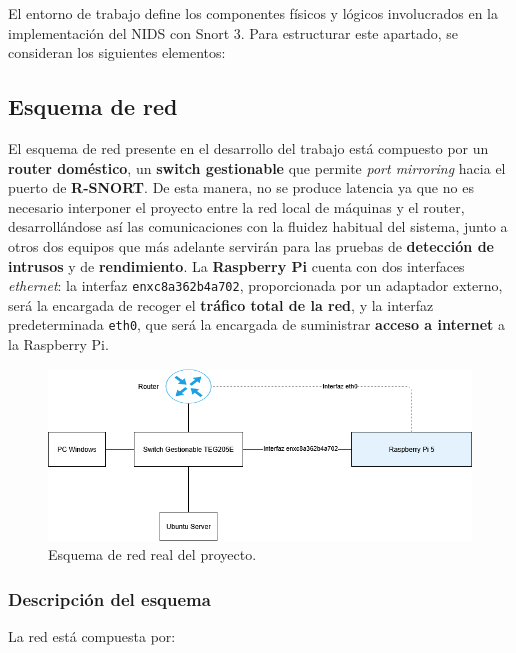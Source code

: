 \documentclass[11pt,a4paper,twoside]{report}
\begin{document}
El entorno de trabajo define los componentes físicos y lógicos involucrados en la implementación del NIDS con Snort 3. Para estructurar este apartado, se consideran los siguientes elementos:

\subsection{Esquema de red}

El esquema de red presente en el desarrollo del trabajo está compuesto por un \textbf{router doméstico}, un \textbf{switch gestionable} que permite \textit{port mirroring} hacia el puerto de \textbf{R-SNORT}. De esta manera, no se produce latencia ya que no es necesario interponer el proyecto entre la red local de máquinas y el router, desarrollándose así las comunicaciones con la fluidez habitual del sistema, junto a otros dos equipos que más adelante servirán para las pruebas de \textbf{detección de intrusos} y de \textbf{rendimiento}. La \textbf{Raspberry Pi} cuenta con dos interfaces \textit{ethernet}: la interfaz \texttt{enxc8a362b4a702}, proporcionada por un adaptador externo, será la encargada de recoger el \textbf{tráfico total de la red}, y la interfaz predeterminada \texttt{eth0}, que será la encargada de suministrar \textbf{acceso a internet} a la Raspberry Pi.

\begin{figure}[H]
	\centering
	\includegraphics[scale=0.6]{script_automatico/network.png}
	\caption{Esquema de red real del proyecto.}
\end{figure}

\subsubsection*{Descripción del esquema}

La red está compuesta por:
\end{document}
